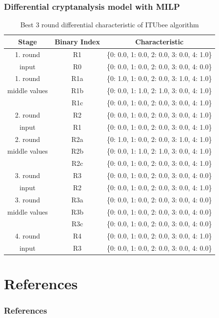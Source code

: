 \documentclass{beamer}
\begin{document}
\begin{frame}
\frametitle{Differential cryptanalysis model with MILP}
\begin{table}[H]
    \footnotesize
    \centering
    \begin{tabular}{|c|c|c|}
        \hline
        \textbf{Stage} & \textbf{Binary Index} & \textbf{Characteristic} \\
        \hline
        1. round  & R1 & \{0: 0.0, 1: 0.0, 2: 0.0, 3: 0.0, 4: 1.0\} \\
        input      & R0 & \{0: 0.0, 1: 0.0, 2: 0.0, 3: 0.0, 4: 0.0\} \\
        \hline
        1. round  & R1a & \{0: 1.0, 1: 0.0, 2: 0.0, 3: 1.0, 4: 1.0\} \\
        middle values   & R1b & \{0: 0.0, 1: 1.0, 2: 1.0, 3: 0.0, 4: 1.0\} \\
                   & R1c & \{0: 0.0, 1: 0.0, 2: 0.0, 3: 0.0, 4: 1.0\} \\
        \hline
        2. round& R2 & \{0: 0.0, 1: 0.0, 2: 0.0, 3: 0.0, 4: 1.0\} \\
        input      & R1 & \{0: 0.0, 1: 0.0, 2: 0.0, 3: 0.0, 4: 1.0\} \\
        \hline
        2. round & R2a & \{0: 1.0, 1: 0.0, 2: 0.0, 3: 1.0, 4: 1.0\} \\
        middle values  & R2b & \{0: 0.0, 1: 1.0, 2: 1.0, 3: 0.0, 4: 1.0\} \\
                   & R2c & \{0: 0.0, 1: 0.0, 2: 0.0, 3: 0.0, 4: 1.0\} \\
        \hline
        3. round  & R3 & \{0: 0.0, 1: 0.0, 2: 0.0, 3: 0.0, 4: 0.0\} \\
        input     & R2 & \{0: 0.0, 1: 0.0, 2: 0.0, 3: 0.0, 4: 1.0\} \\
        \hline
        3. round  & R3a & \{0: 0.0, 1: 0.0, 2: 0.0, 3: 0.0, 4: 0.0\} \\
        middle values   & R3b & \{0: 0.0, 1: 0.0, 2: 0.0, 3: 0.0, 4: 0.0\} \\
                   & R3c & \{0: 0.0, 1: 0.0, 2: 0.0, 3: 0.0, 4: 0.0\} \\
        \hline
        4. round & R4 & \{0: 0.0, 1: 0.0, 2: 0.0, 3: 0.0, 4: 1.0\} \\
        input    & R3 & \{0: 0.0, 1: 0.0, 2: 0.0, 3: 0.0, 4: 0.0\} \\
        \hline
    \end{tabular}
    \caption{Best 3 round differential characteristic of ITUbee algorithm}
    \label{tab:MILPcharDif}
\end{table}

\end{frame}

\section{References}

\begin{frame}
\frametitle{References}

\printbibliography

\end{frame}
\end{document}
